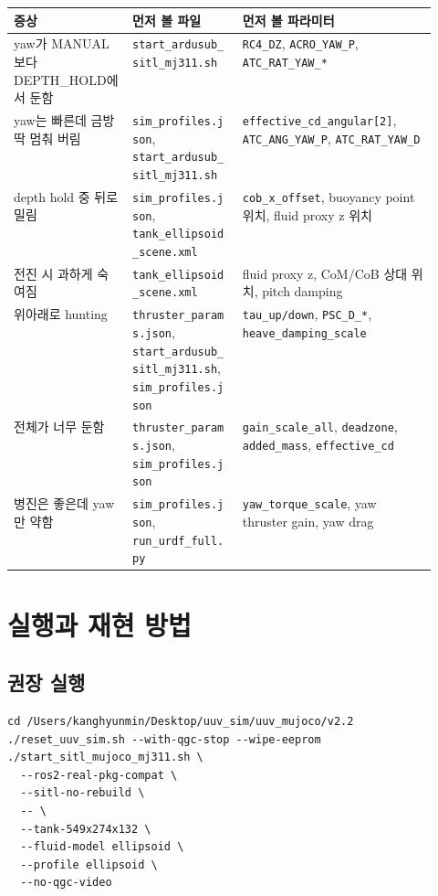 \documentclass[11pt,a4paper]{article}
\newcommand{\code}[1]{\nolinkurl{#1}}
\begin{document}
\begin{center}
\small
\begin{tabularx}{\linewidth}{>{\raggedright\arraybackslash}p{0.28\linewidth}>{\raggedright\arraybackslash}p{0.26\linewidth}Y}
\toprule
증상 & 먼저 볼 파일 & 먼저 볼 파라미터 \\
\midrule
yaw가 MANUAL보다 DEPTH\_HOLD에서 둔함 & \code{start\_ardusub\_sitl\_mj311.sh} & \code{RC4\_DZ}, \code{ACRO\_YAW\_P}, \code{ATC\_RAT\_YAW\_*} \\
yaw는 빠른데 금방 딱 멈춰 버림 & \code{sim\_profiles.json}, \code{start\_ardusub\_sitl\_mj311.sh} & \code{effective\_cd\_angular[2]}, \code{ATC\_ANG\_YAW\_P}, \code{ATC\_RAT\_YAW\_D} \\
depth hold 중 뒤로 밀림 & \code{sim\_profiles.json}, \code{tank\_ellipsoid\_scene.xml} & \code{cob\_x\_offset}, buoyancy point 위치, fluid proxy z 위치 \\
전진 시 과하게 숙여짐 & \code{tank\_ellipsoid\_scene.xml} & fluid proxy z, CoM/CoB 상대 위치, pitch damping \\
위아래로 hunting & \code{thruster\_params.json}, \code{start\_ardusub\_sitl\_mj311.sh}, \code{sim\_profiles.json} & \code{tau\_up/down}, \code{PSC\_D\_*}, \code{heave\_damping\_scale} \\
전체가 너무 둔함 & \code{thruster\_params.json}, \code{sim\_profiles.json} & \code{gain\_scale\_all}, \code{deadzone}, \code{added\_mass}, \code{effective\_cd} \\
병진은 좋은데 yaw만 약함 & \code{sim\_profiles.json}, \code{run\_urdf\_full.py} & \code{yaw\_torque\_scale}, yaw thruster gain, yaw drag \\
\bottomrule
\end{tabularx}
\end{center}

\section{실행과 재현 방법}

\subsection{권장 실행}

\begin{verbatim}
cd /Users/kanghyunmin/Desktop/uuv_sim/uuv_mujoco/v2.2
./reset_uuv_sim.sh --with-qgc-stop --wipe-eeprom
./start_sitl_mujoco_mj311.sh \
  --ros2-real-pkg-compat \
  --sitl-no-rebuild \
  -- \
  --tank-549x274x132 \
  --fluid-model ellipsoid \
  --profile ellipsoid \
  --no-qgc-video
\end{verbatim}
\end{document}
